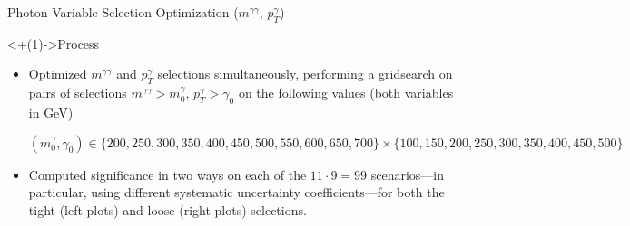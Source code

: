 \documentclass[handout]{beamer}
\begin{document}
\begin{frame}{Photon Variable Selection Optimization ($m^{\gamma \gamma}$, $p_T^{\gamma}$)}
    \begin{block}<+(1)->{Process}
        \begin{itemize}[<+(1)->]
            \item Optimized $m^{\gamma \gamma}$ and $p_T^{\gamma}$ selections simultaneously, performing a gridsearch on pairs of selections $m^{\gamma \gamma} > m^\gamma_0$, $p_T^\gamma > \gamma_0$ on the following values (both variables in GeV)
            
            \smallskip
            
            $(m^\gamma_0, \gamma_0) \in \{200, 250, 300, 350, 400, 450, 500, 550, 600, 650, 700\} \times \{100, 150, 200, 250, 300, 350, 400, 450, 500\}$
            
            \item Computed significance in two ways on each of the $11 \cdot 9 = 99$ scenarios---in particular, using different systematic uncertainty coefficients---for both the tight (left plots) and loose (right plots) selections.
        \end{itemize}
    \end{block}
    
    \bigskip
    
    \begin{columns}
    \end{columns}
    

\end{frame}
\end{document}
